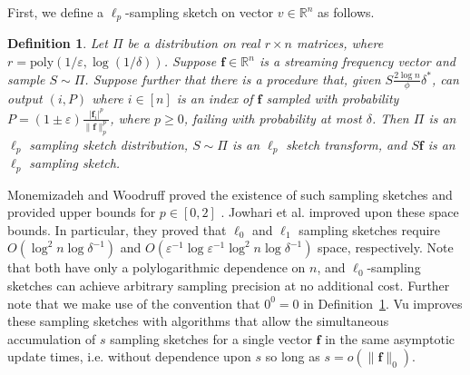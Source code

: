 \documentclass{report}
\newtheorem{definition}{Definition}[section]
\newcommand{\algoname}[1]{\textnormal{\textsc{#1}}}
\newcommand{\poly}{\mathrm{poly}}
\begin{document}
First, we define a $\ell_p$-sampling sketch on vector $v \in \mathbb{R}^n$ as follows.
%
\begin{definition} \label{def:lp-sample}
Let $\Pi$ be a distribution on real $r \times n$ matrices, where $r = \poly(1/\varepsilon, \log(1/\delta))$. 
Suppose $\mathbf{f} \in \mathbb{R}^n$ is a streaming frequency vector and sample $S \sim \Pi$. 
Suppose further that there is a procedure that, given $S\frac{2\log n}{\phi}\delta^*$, can output $(i,P)$ where $i \in [n]$ is an index of $\mathbf{f}$ sampled with probability $P = (1 \pm \varepsilon)\frac{|\mathbf{f}_i|^p}{\|\mathbf{f}\|^p_p}$, where $p \geq 0$, failing with probability at most $\delta$. 
Then $\Pi$ is an $\ell_p$ sampling sketch distribution, $S \sim \Pi$ is an $\ell_p$ sketch transform, and $S\mathbf{f}$ is an $\ell_p$ sampling sketch.
\end{definition}
%

Monemizadeh and Woodruff proved the existence of such sampling sketches and provided upper bounds for $p \in [0,2]$ \cite{monemizadeh20101}.
Jowhari et al. \cite{jowhari2011tight} improved upon these space bounds.
In particular, they proved that $\ell_0$ and $\ell_1$ sampling sketches require $O(\log^2 n \log \delta^{-1})$ and $O(\varepsilon^{-1} \log \varepsilon^{-1} \log^2 n \log \delta^{-1})$ space, respectively.
Note that both have only a polylogarithmic dependence on $n$, and $\ell_0$-sampling sketches can achieve arbitrary sampling precision at no additional cost. 
Further note that we make use of the convention that $0^0 = 0$ in Definition~\ref{def:lp-sample}.
Vu improves these sampling sketches with algorithms that allow the simultaneous accumulation of $s$ sampling sketches for a single vector $\mathbf{f}$ in the same asymptotic update times, i.e. without dependence upon $s$ so long as $s = o(\|\mathbf{f}\|_0)$.
\end{document}

